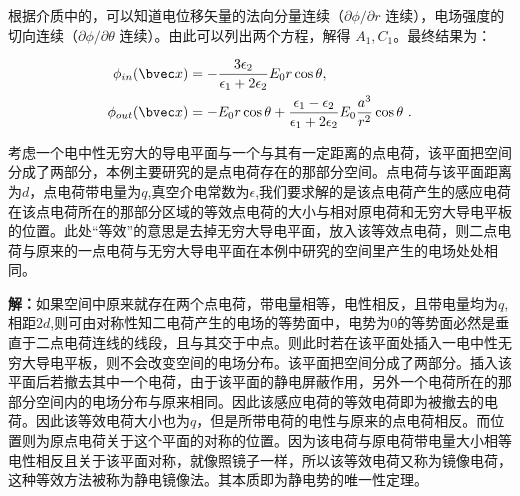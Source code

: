根据介质中的，可以知道电位移矢量的法向分量连续（$\partial\phi/\partial r$ 连续），电场强度的切向连续（$\partial\phi/\partial \theta$ 连续）。由此可以列出两个方程，解得 $A_1,C_1$。最终结果为：

\begin{align}
\phi_{in}(\bvec x)&=-\frac{3\epsilon_2}{\epsilon_1+2\epsilon_2}E_0r\cos\theta,\\
\phi_{out}(\bvec x)&=-E_0r\cos\theta+\frac{\epsilon_1-\epsilon_2}{\epsilon_1+2\epsilon_2}E_0\frac{a^3}{r^2}\cos\theta~.
\end{align}
\begin{example}{}\label{ex_empoi_1}
考虑一个电中性无穷大的导电平面与一个与其有一定距离的点电荷，该平面把空间分成了两部分，本例主要研究的是点电荷存在的那部分空间。点电荷与该平面距离为$d$，点电荷带电量为$q$,真空介电常数为$\epsilon$,我们要求解的是该点电荷产生的感应电荷在该点电荷所在的那部分区域的等效点电荷的大小与相对原电荷和无穷大导电平板的位置。此处“等效”的意思是去掉无穷大导电平面，放入该等效点电荷，则二点电荷与原来的一点电荷与无穷大导电平面在本例中研究的空间里产生的电场处处相同。
\end{example}
\textbf{解：}如果空间中原来就存在两个点电荷，带电量相等，电性相反，且带电量均为$q$,相距$2d$,则可由对称性知二电荷产生的电场的等势面中，电势为$0$的等势面必然是垂直于二点电荷连线的线段，且与其交于中点。则此时若在该平面处插入一电中性无穷大导电平板，则不会改变空间的电场分布。该平面把空间分成了两部分。插入该平面后若撤去其中一个电荷，由于该平面的静电屏蔽作用，另外一个电荷所在的那部分空间内的电场分布与原来相同。因此该感应电荷的等效电荷即为被撤去的电荷。因此该等效电荷大小也为$q$，但是所带电荷的电性与原来的点电荷相反。而位置则为原点电荷关于这个平面的对称的位置。因为该电荷与原电荷带电量大小相等电性相反且关于该平面对称，就像照镜子一样，所以该等效电荷又称为镜像电荷，这种等效方法被称为静电镜像法。其本质即为静电势的唯一性定理。
